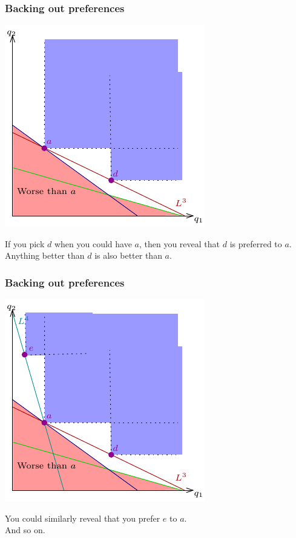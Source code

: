 \documentclass[xcolor=pdftex,dvipsnames]{beamer}
\begin{document}
\begin{frame}
\frametitle{Backing out preferences}
\begin{center}
\includegraphics{pics/RevPref5}
\end{center}
If you pick $d$ when you could have $a$, then you reveal that $d$ is
preferred to $a$. Anything better than $d$ is also better than $a$.
\end{frame}


\begin{frame}
\frametitle{Backing out preferences}
\begin{center}
\includegraphics{pics/RevPref6}
\end{center}
You could similarly reveal that you prefer $e$ to $a$. \\
And so on.
\end{frame}
\end{document}
